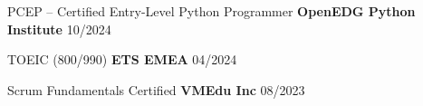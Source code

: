 



\begin{cvhonors}


  \cvhonor
    {PCEP – Certified Entry-Level
Python Programmer} %
    {\textbf{OpenEDG Python Institute}} %
    {} %
    {10/2024} %

  \cvhonor
    {TOEIC (800/990)} %
    {\textbf{ETS EMEA}} %
    {} %
    {04/2024} %

  \cvhonor
    {Scrum Fundamentals Certified} %
    {\textbf{VMEdu Inc}} %
    {} %
    {08/2023} %

\end{cvhonors}